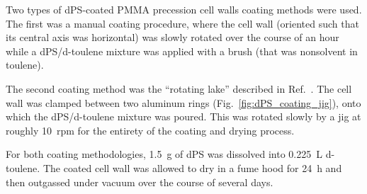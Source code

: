 Two types of dPS-coated PMMA precession cell walls coating methods were used. The first was a manual coating procedure, where the cell wall (oriented such that its central axis was horizontal) was slowly rotated over the course of an hour while a dPS/d-toulene mixture was applied with a brush (that was nonsolvent in toulene). 

The second coating method was the ``rotating lake'' described in Ref.~\cite{bodek_storage_2008}. The cell wall was clamped between two aluminum rings (Fig.~\ref{fig:dPS_coating_jig}), onto which the dPS/d-toulene mixture was poured. This was rotated slowly by a jig at roughly \qty{10}{rpm} for the entirety of the coating and drying process.

For both coating methodologies, \qty{1.5}{\gram} of dPS was dissolved into \qty{0.225}{\liter} d-toulene. The coated cell wall was allowed to dry in a fume hood for \qty{24}{\hour} and then outgassed under vacuum over the course of several days.